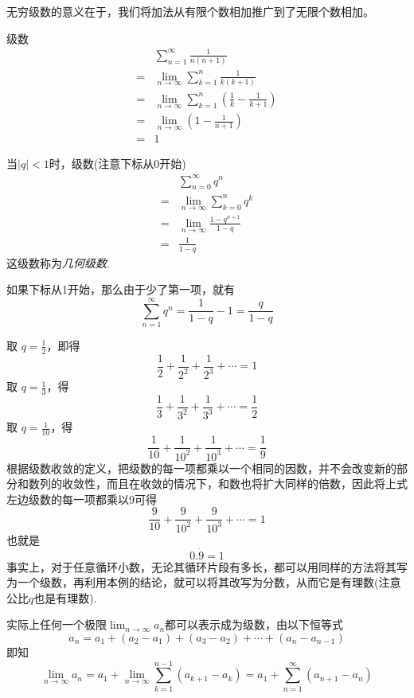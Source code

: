 无穷级数的意义在于，我们将加法从有限个数相加推广到了无限个数相加。

\begin{example}
  级数
  \begin{equation*}
    \begin{split}
      & \sum_{n=1}^{\infty}\frac{1}{n(n+1)} \\
      = &  \lim_{n\to\infty} \sum_{k=1}^{n}\frac{1}{k(k+1)} \\
    = &  \lim_{n\to\infty} \sum_{k=1}^{n} \left( \frac{1}{k} - \frac{1}{k+1} \right)  \\
    = & \lim_{n\to\infty} \left( 1 - \frac{1}{n+1} \right) \\
    =  & 1
    \end{split}
  \end{equation*}
\end{example}

\begin{example}
  当$|q|<1$时，级数(注意下标从0开始)
  \begin{equation*}
    \begin{split}
      &  \sum_{n=0}^{\infty}q^n \\
      = & \lim_{n\to\infty} \sum_{k=0}^{n}q^k \\
      = & \lim_{n\to\infty} \frac{1-q^{n+1}}{1-q} \\
      = & \frac{1}{1-q}
    \end{split}
  \end{equation*}
  这级数称为\emph{几何级数}.

  如果下标从1开始，那么由于少了第一项，就有
  \[ \sum_{n=1}^{\infty}q^n = \frac{1}{1-q}-1 = \frac{q}{1-q} \]

  取 $q=\frac{1}{2}$，即得
  \[ \frac{1}{2} + \frac{1}{2^2} + \frac{1}{2^3} + \cdots = 1 \]
  取 $q=\frac{1}{3}$，得
  \[ \frac{1}{3} + \frac{1}{3^2} + \frac{1}{3^3} + \cdots = \frac{1}{2} \]
  取 $q=\frac{1}{10}$，得
  \[ \frac{1}{10} + \frac{1}{10^2} + \frac{1}{10^3} + \cdots = \frac{1}{9} \]
  根据级数收敛的定义，把级数的每一项都乘以一个相同的因数，并不会改变新的部分和数列的收敛性，而且在收敛的情况下，和数也将扩大同样的倍数，因此将上式左边级数的每一项都乘以9可得
  \[ \frac{9}{10} + \frac{9}{10^2} + \frac{9}{10^3} + \cdots = 1 \]
  也就是
  \[ 0.\dot{9}=1 \]
  事实上，对于任意循环小数，无论其循环片段有多长，都可以用同样的方法将其写为一个级数，再利用本例的结论，就可以将其改写为分数，从而它是有理数(注意公比$q$也是有理数).
\end{example}

  \begin{example}
    实际上任何一个极限$\lim_{n\to\infty}a_n$都可以表示成为级数，由以下恒等式
    \[ a_n = a_1+(a_2-a_1)+(a_3-a_2)+\cdots+(a_n-a_{n-1}) \]
   即知 
    \[ \lim_{n\to\infty}a_n = a_1+\lim_{n\to\infty}\sum_{k=1}^{n-1}(a_{k+1}-a_{k}) = a_1+\sum_{n=1}^{\infty}(a_{n+1}-a_n) \]
  \end{example}


